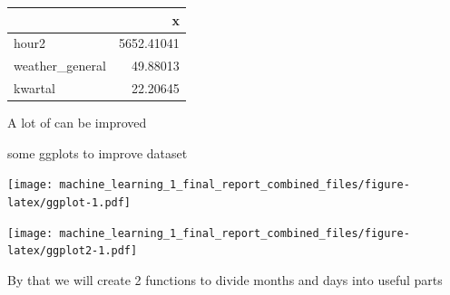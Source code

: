 \documentclass[
]{article}
\begin{document}
\begin{longtable}[]{@{}lr@{}}
\toprule
& x\tabularnewline
\midrule
\endhead
hour2 & 5652.41041\tabularnewline
weather\_general & 49.88013\tabularnewline
kwartal & 22.20645\tabularnewline
\bottomrule
\end{longtable}

A lot of can be improved

some ggplots to improve dataset

\texttt{[image: machine\_learning\_1\_final\_report\_combined\_files/figure-latex/ggplot-1.pdf]}

\texttt{[image: machine\_learning\_1\_final\_report\_combined\_files/figure-latex/ggplot2-1.pdf]}

By that we will create 2 functions to divide months and days into useful
parts
\end{document}
